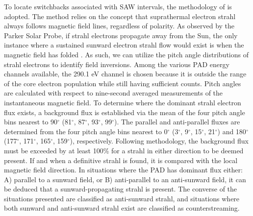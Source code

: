 \documentclass[twocolumn, times]{aastex631}
\begin{document}
To locate switchbacks associated with SAW intervals, the methodology of \cite{owens13} is adopted. The method relies on the concept that suprathermal electron strahl always follows magnetic field lines, regardless of polarity. As observed by the Parker Solar Probe, if strahl electrons propagate away from the Sun, the only instance where a sustained sunward electron strahl flow would exist is when the magnetic field has folded \citep{halekas2020}. As such, we can utilize the pitch angle distributions of strahl electrons to identify field inversions. Among the various PAD energy channels available, the 290.1 eV channel is chosen because it is outside the range of the core electron population while still having sufficient counts. Pitch angles are calculated with respect to nine-second averaged measurements of the instantaneous magnetic field. To determine where the dominant strahl electron flux exists, a background flux is established via the mean of the four pitch angle bins nearest to 90$^{\circ}$ (81$^{\circ}$, 87$^{\circ}$, 93$^{\circ}$, 99$^{\circ}$). The parallel and anti-parallel fluxes are determined from the four pitch angle bins nearest to 0$^{\circ}$ (3$^{\circ}$, 9$^{\circ}$, 15$^{\circ}$, 21$^{\circ}$) and 180$^{\circ}$ (177$^{\circ}$, 171$^{\circ}$, 165$^{\circ}$, 159$^{\circ}$), respectively. Following \cite{owens13} methodology, the background flux must be exceeded by at least 100\% for a strahl in either direction to be deemed present. If and when a definitive strahl is found, it is compared with the local magnetic field direction. In situations where the PAD has dominant flux either: A) parallel to a sunward field, or B) anti-parallel to an anti-sunward field, it can be deduced that a sunward-propagating strahl is present. The converse of the situations presented are classified as anti-sunward strahl, and situations where both sunward and anti-sunward strahl exist are classified as counterstreaming.
\end{document}
